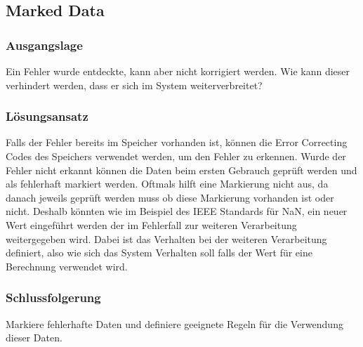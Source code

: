 \subsection{Marked Data}

\subsubsection*{Ausgangslage}

Ein Fehler wurde entdeckte, kann aber nicht korrigiert werden. Wie kann dieser verhindert werden, dass er sich im System weiterverbreitet?

\subsubsection*{Lösungsansatz}

Falls der Fehler bereits im Speicher vorhanden ist, können die Error Correcting Codes des Speichers verwendet werden, um den Fehler zu erkennen. Wurde der Fehler nicht erkannt können die Daten beim ersten Gebrauch geprüft werden und als fehlerhaft markiert werden. Oftmals hilft eine Markierung nicht aus, da danach jeweils geprüft werden muss ob diese Markierung vorhanden ist oder nicht. Deshalb könnten wie im Beispiel des IEEE Standards für NaN, ein neuer Wert eingeführt werden der im Fehlerfall zur weiteren Verarbeitung weitergegeben wird. Dabei ist das Verhalten bei der weiteren Verarbeitung definiert, also wie sich das System Verhalten soll falls der Wert für eine Berechnung verwendet wird.

\subsubsection*{Schlussfolgerung}

Markiere fehlerhafte Daten und definiere geeignete Regeln für die Verwendung dieser Daten.


